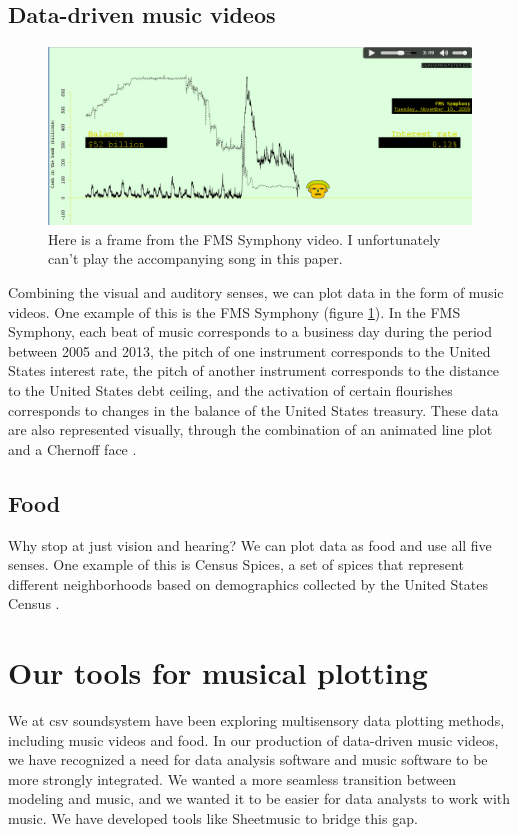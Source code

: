 \documentclass{acm_proc_article-sp}
\begin{document}
\subsection{Data-driven music videos}
\begin{figure} \label{fms}
\centering
\includegraphics[width=\textwidth]{../sensory-data-experiences/fms.png}
\caption{Here is a frame from the FMS Symphony video. I unfortunately can't play the accompanying song in this paper.}
\end{figure}

Combining the visual and auditory senses, we can plot data in the form
of music videos. One example of this is the FMS Symphony (figure \ref{fms}).
In the FMS Symphony, each beat of music corresponds to a business day
during the period between 2005 and 2013, the pitch of one instrument
corresponds to the United States interest rate, the pitch of another
instrument corresponds to the distance to the United States debt ceiling,
and the activation of certain flourishes corresponds to changes in the
balance of the United States treasury. These data are also represented
visually, through the combination of an animated line plot and a
Chernoff face \cite{fms-about}.

\subsection{Food}
Why stop at just vision and hearing? We can plot data as food and use
all five senses. One example of this is Census Spices, a set of spices
that represent different neighborhoods based on demographics collected
by the United States Census \cite{censusspices}.

\section{Our tools for musical plotting}
We at csv soundsystem have been exploring multisensory
data plotting methods, including music videos and food.
In our production of data-driven music videos, we have recognized a need
for data analysis software and music software to be more strongly integrated.
We wanted a more seamless transition between modeling and music, and we
wanted it to be easier for data analysts to work with music. We have
developed tools like Sheetmusic to bridge this gap.
\end{document}
